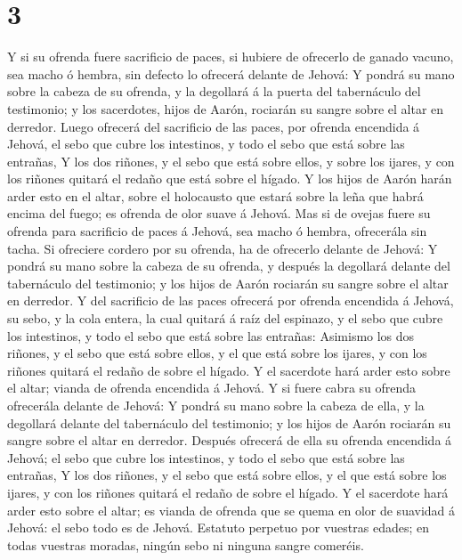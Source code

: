 \hypertarget{section-2}{%
\section{3}\label{section-2}}

 Y si su ofrenda fuere sacrificio de paces, si hubiere de
ofrecerlo de ganado vacuno, sea macho ó hembra, sin defecto lo ofrecerá
delante de Jehová:  Y pondrá su mano sobre la cabeza de su
ofrenda, y la degollará á la puerta del tabernáculo del testimonio; y
los sacerdotes, hijos de Aarón, rociarán su sangre sobre el altar en
derredor.  Luego ofrecerá del sacrificio de las paces, por
ofrenda encendida á Jehová, el sebo que cubre los intestinos, y todo el
sebo que está sobre las entrañas,  Y los dos riñones, y el
sebo que está sobre ellos, y sobre los ijares, y con los riñones quitará
el redaño que está sobre el hígado.  Y los hijos de Aarón
harán arder esto en el altar, sobre el holocausto que estará sobre la
leña que habrá encima del fuego; es ofrenda de olor suave á Jehová.
 Mas si de ovejas fuere su ofrenda para sacrificio de
paces á Jehová, sea macho ó hembra, ofrecerála sin tacha. 
Si ofreciere cordero por su ofrenda, ha de ofrecerlo delante de Jehová:
 Y pondrá su mano sobre la cabeza de su ofrenda, y después
la degollará delante del tabernáculo del testimonio; y los hijos de
Aarón rociarán su sangre sobre el altar en derredor.  Y
del sacrificio de las paces ofrecerá por ofrenda encendida á Jehová, su
sebo, y la cola entera, la cual quitará á raíz del espinazo, y el sebo
que cubre los intestinos, y todo el sebo que está sobre las entrañas:
 Asimismo los dos riñones, y el sebo que está sobre
ellos, y el que está sobre los ijares, y con los riñones quitará el
redaño de sobre el hígado.  Y el sacerdote hará arder
esto sobre el altar; vianda de ofrenda encendida á Jehová.
 Y si fuere cabra su ofrenda ofrecerála delante de
Jehová:  Y pondrá su mano sobre la cabeza de ella, y la
degollará delante del tabernáculo del testimonio; y los hijos de Aarón
rociarán su sangre sobre el altar en derredor.  Después
ofrecerá de ella su ofrenda encendida á Jehová; el sebo que cubre los
intestinos, y todo el sebo que está sobre las entrañas, 
Y los dos riñones, y el sebo que está sobre ellos, y el que está sobre
los ijares, y con los riñones quitará el redaño de sobre el hígado.
 Y el sacerdote hará arder esto sobre el altar; es vianda
de ofrenda que se quema en olor de suavidad á Jehová: el sebo todo es de
Jehová.  Estatuto perpetuo por vuestras edades; en todas
vuestras moradas, ningún sebo ni ninguna sangre comeréis.


